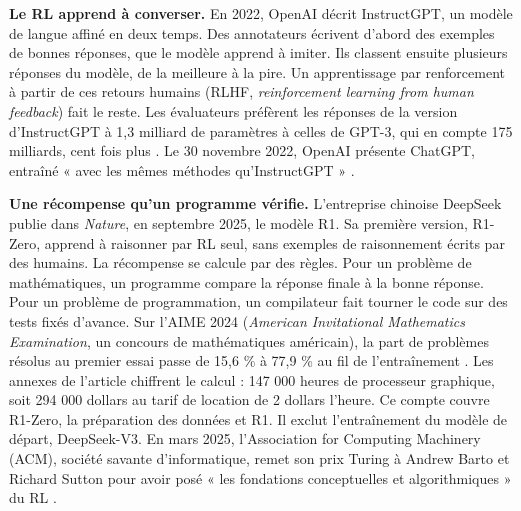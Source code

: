 \documentclass[11pt,a4paper]{article}
\begin{document}
\textbf{Le RL apprend à converser.} En 2022, OpenAI décrit InstructGPT,
un modèle de langue affiné en deux temps. Des annotateurs écrivent
d'abord des exemples de bonnes réponses, que le modèle apprend à imiter.
Ils classent ensuite plusieurs réponses du modèle, de la meilleure à la
pire. Un apprentissage par renforcement à partir de ces retours humains
(RLHF, \emph{reinforcement learning from human feedback}) fait le reste.
Les évaluateurs préfèrent les réponses de la version d'InstructGPT à 1,3
milliard de paramètres à celles de GPT-3, qui en compte 175 milliards,
cent fois plus \autocite{ouyang2022instructgpt}. Le 30 novembre 2022,
OpenAI présente ChatGPT, entraîné « avec les mêmes méthodes
qu'InstructGPT » \autocite{openai2022chatgpt}.

\textbf{Une récompense qu'un programme vérifie.} L'entreprise chinoise
DeepSeek publie dans \emph{Nature}, en septembre 2025, le modèle R1. Sa
première version, R1-Zero, apprend à raisonner par RL seul, sans
exemples de raisonnement écrits par des humains. La récompense se
calcule par des règles. Pour un problème de mathématiques, un programme
compare la réponse finale à la bonne réponse. Pour un problème de
programmation, un compilateur fait tourner le code sur des tests fixés
d'avance. Sur l'AIME 2024 (\emph{American Invitational Mathematics
Examination}, un concours de mathématiques américain), la part de
problèmes résolus au premier essai passe de 15,6 \% à 77,9 \% au fil de
l'entraînement \autocite{deepseek2025r1}. Les annexes de l'article
chiffrent le calcul : 147 000 heures de processeur graphique, soit 294
000 dollars au tarif de location de 2 dollars l'heure. Ce compte couvre
R1-Zero, la préparation des données et R1. Il exclut l'entraînement du
modèle de départ, DeepSeek-V3. En mars 2025, l'Association for Computing
Machinery (ACM), société savante d'informatique, remet son prix Turing à
Andrew Barto et Richard Sutton pour avoir posé « les fondations
conceptuelles et algorithmiques » du RL \autocite{acm2025turing}.
\end{document}
